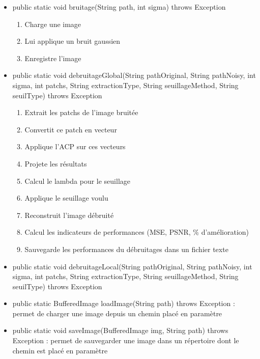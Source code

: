 \begin{itemize}
    \item public static void bruitage(String path, int sigma) throws Exception
    \begin{enumerate}
        \item Charge une image
        \item Lui applique un bruit gaussien
        \item Enregistre l'image
    \end{enumerate}
    \item public static void debruitageGlobal(String pathOriginal, String pathNoisy, int sigma, int patchs, String extractionType, String seuillageMethod, String seuilType) throws Exception
    \begin{enumerate}
        \item Extrait les patchs de l'image bruitée
        \item Convertit ce patch en vecteur
        \item Applique l'ACP sur ces vecteurs
        \item Projete les résultats
        \item Calcul le lambda pour le seuillage
        \item Applique le seuillage voulu
        \item Reconstruit l'image débruité
        \item Calcul les indicateurs de performances (MSE, PSNR, \% d'amélioration)
        \item Sauvegarde les performances du débruitages dans un fichier texte
    \end{enumerate}
    \item public static void debruitageLocal(String pathOriginal, String pathNoisy, int sigma, int patchs, String extractionType, String seuillageMethod, String seuilType) throws Exception
    \item public static BufferedImage loadImage(String path) throws Exception : permet de charger une image depuis un chemin placé en paramètre
    \item public static void saveImage(BufferedImage img, String path) throws Exception : permet de sauvegarder une image dans un répertoire dont le chemin est placé en paramètre
\end{itemize}

